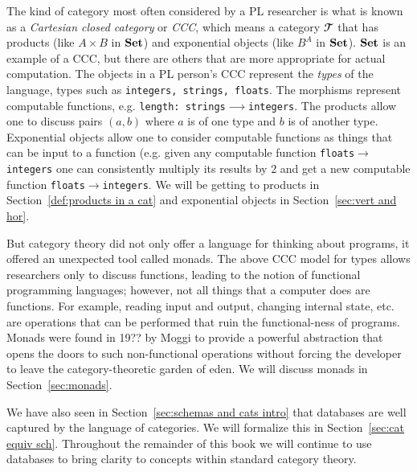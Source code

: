 \documentclass[../main/CT4S-EN-RU]{subfiles}
\begin{document}
\begin{blockENG}
The kind of category most often considered by a PL researcher is what is known as a {\em Cartesian closed category} or {\em CCC}, which means a category ${𝓣}$ that has products (like $A\times B$ in ${\mathbf{Set}}$) and exponential objects (like $B^A$ in ${\mathbf{Set}}$). ${\mathbf{Set}}$ is an example of a CCC, but there are others that are more appropriate for actual computation. The objects in a PL person's CCC represent the {\em types} of the language, types such as {\tt integers, strings, floats}. The morphisms represent computable functions, e.g. {\tt length: strings}${⟶}${\tt integers}. The products allow one to discuss pairs $(a,b)$ where $a$ is of one type and $b$ is of another type. Exponential objects allow one to consider computable functions as things that can be input to a function (e.g. given any computable function {\tt floats}${→}${\tt integers} one can consistently multiply its results by 2 and get a new computable function {\tt floats}${→}${\tt integers}. We will be getting to products in Section~\ref{def:products in a cat} and exponential objects in Section~\ref{sec:vert and hor}. 
\end{blockENG}

\begin{blockRUS}
\end{blockRUS}

\begin{blockENG}
But category theory did not only offer a language for thinking about programs, it offered an unexpected tool called monads. The above CCC model for types allows researchers only to discuss functions, leading to the notion of functional programming languages; however, not all things that a computer does are functions. For example, reading input and output, changing internal state, etc. are operations that can be performed that ruin the functional-ness of programs. Monads were found in 19?? by Moggi \cite{Mog} to provide a powerful abstraction that opens the doors to such non-functional operations without forcing the developer to leave the category-theoretic garden of eden. We will discuss monads in Section~\ref{sec:monads}.
\end{blockENG}

\begin{blockRUS}
\end{blockRUS}

\begin{blockENG}
We have also seen in Section~\ref{sec:schemas and cats intro} that databases are well captured by the language of categories. We will formalize this in Section~\ref{sec:cat equiv sch}. Throughout the remainder of this book we will continue to use databases to bring clarity to concepts within standard category theory. 
\end{blockENG}
\end{document}
